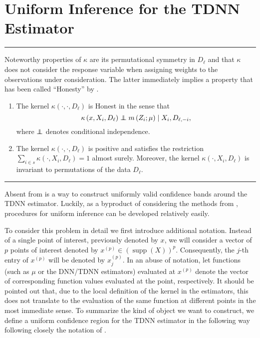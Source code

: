 \section{Uniform Inference for the TDNN Estimator}\label{sec:unif_inf}
\hrule

Noteworthy properties of $\kappa$ are its permutational symmetry in $D_{\ell}$ and that $\kappa$ does not consider the response variable when assigning weights to the observations under consideration.
The latter immediately implies a property that has been called ``Honesty'' by \citet{wager_estimation_2018}.

\begin{boxD}
	\begin{dfn}\label{Symmetry_Honesty}\mbox{}
		\begin{enumerate}
			\item The kernel $\kappa\left(\cdot, \cdot, D_{\ell}\right)$ is Honest in the sense that
				  $$\kappa\left(x, X_{i}, D_{\ell}\right) \perp\!\!\!\!\perp m\left(Z_{i} ; \mu\right) \mid X_{i}, D_{\ell,-i},$$
				  where $\perp\!\!\!\!\perp$ denotes conditional independence.
			\item The kernel $\kappa\left(\cdot, \cdot, D_{\ell}\right)$ is positive and satisfies the restriction
				  $\sum_{i \in s} \kappa\left(\cdot, X_{i}, D_{\ell}\right)=1$ almost surely.
				  Moreover, the kernel $\kappa\left(\cdot, X_{i}, D_{\ell}\right)$ is invariant to permutations of the data $D_{\ell}.$
		\end{enumerate}
	\end{dfn}
\end{boxD}

\hrule
Absent from \citet{demirkaya_optimal_2024} is a way to construct uniformly valid confidence bands around the TDNN estimator.
Luckily, as a byproduct of considering the methods from \citet{ritzwoller_uniform_2024}, procedures for uniform inference can be developed relatively easily.

To consider this problem in detail we first introduce additional notation.
Instead of a single point of interest, previously denoted by $x$, we will consider a vector of $p$ points of interest denoted by $x^{(p)} \in \left(\operatorname{supp}\left(X\right)\right)^{p}$.
Consequently, the $j$-th entry of $x^{(p)}$ will be denoted by $x^{(p)}_{j}$.
In an abuse of notation, let functions (such as $\mu$ or the DNN/TDNN estimators) evaluated at $x^{(p)}$ denote the vector of corresponding function values evaluated at the point, respectively.
It should be pointed out that, due to the local definition of the kernel in the estimators, this does not translate to the evaluation of the same function at different points in the most immediate sense.
To summarize the kind of object we want to construct, we define a uniform confidence region for the TDNN estimator in the following way following closely the notation of \citet{ritzwoller_uniform_2024}.

